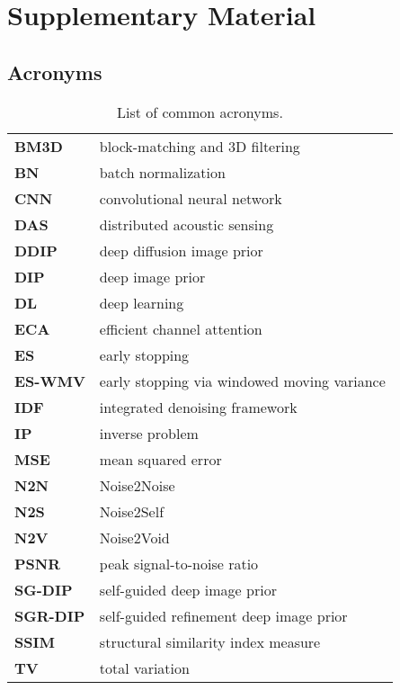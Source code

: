 \chapter{Supplementary Material}

\section{Acronyms}

\begin{table}[h!]
    \centering
    \begin{tabular}{ l l }
        \toprule
        \textbf{BM3D} & block-matching and 3D filtering \\
        \textbf{BN} & batch normalization \\
        \textbf{CNN} & convolutional neural network \\
        \textbf{DAS} & distributed acoustic sensing \\
        \textbf{DDIP} & deep diffusion image prior \\
        \textbf{DIP} & deep image prior \\
        \textbf{DL} & deep learning \\
        \textbf{ECA} & efficient channel attention \\
        \textbf{ES} & early stopping \\
        \textbf{ES-WMV} & early stopping via windowed moving variance \\
        \textbf{IDF} & integrated denoising framework \\
        \textbf{IP} & inverse problem \\
        \textbf{MSE} & mean squared error \\
        \textbf{N2N} & Noise2Noise \\
        \textbf{N2S} & Noise2Self \\
        \textbf{N2V} & Noise2Void \\
        \textbf{PSNR} & peak signal-to-noise ratio \\
        \textbf{SG-DIP} & self-guided deep image prior \\
        \textbf{SGR-DIP} & self-guided refinement deep image prior \\
        \textbf{SSIM} & structural similarity index measure \\
        \textbf{TV} & total variation \\
        \bottomrule
    \end{tabular}
    \caption{List of common acronyms.}
\end{table}

